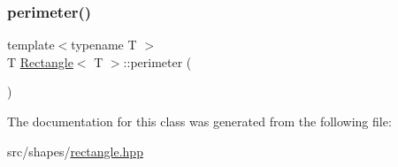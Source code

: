 \mbox{\label{classRectangle_a9c59dcb7376296711ad86e2da924d3c8}} 
\subsubsection{\texorpdfstring{perimeter()}{perimeter()}}
{\footnotesize\ttfamily template$<$typename T $>$ \\
T \mbox{\hyperlink{classRectangle}{Rectangle}}$<$ T $>$\+::perimeter (\begin{DoxyParamCaption}{ }\end{DoxyParamCaption})}



The documentation for this class was generated from the following file\+:\begin{DoxyCompactItemize}
\item 
src/shapes/\mbox{\hyperlink{rectangle_8hpp}{rectangle.\+hpp}}\end{DoxyCompactItemize}
